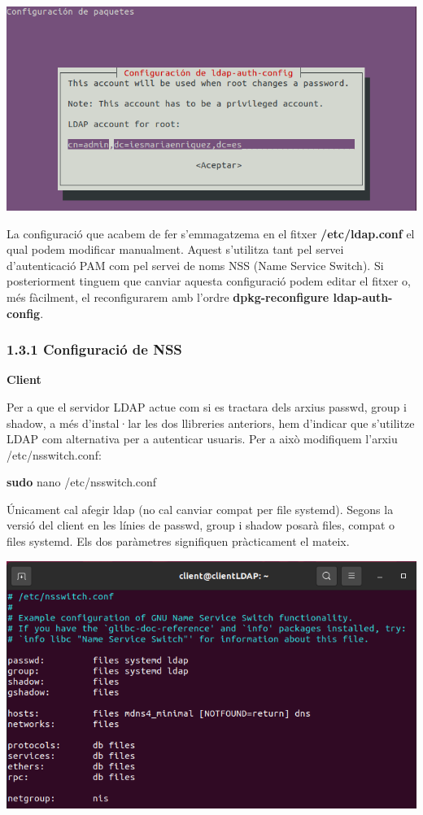 \documentclass[
  12 pt,
  a4paper,
]{article}
\newenvironment{Shaded}{\begin{snugshade}}{\end{snugshade}}
\newcommand{\FunctionTok}[1]{\textcolor[rgb]{0.13,0.29,0.53}{\textbf{#1}}}
\newcommand{\NormalTok}[1]{#1}
\begin{document}
\includegraphics{png/libpam3.png}

La configuració que acabem de fer s'emmagatzema en el fitxer
\textbf{/etc/ldap.conf} el qual podem modificar manualment. Aquest
s'utilitza tant pel servei d'autenticació PAM com pel servei de noms NSS
(Name Service Switch). Si posteriorment tinguem que canviar aquesta
configuració podem editar el fitxer o, més fàcilment, el reconfigurarem
amb l'ordre \textbf{dpkg-reconfigure ldap-auth-config}.

\subsubsection{1.3.1 Configuració de NSS}\label{configuraciuxf3-de-nss}

\textbf{Client}

Per a que el servidor LDAP actue com si es tractara dels arxius passwd,
group i shadow, a més d'instal·lar les dos llibreries anteriors, hem
d'indicar que s'utilitze LDAP com alternativa per a autenticar usuaris.
Per a això modifiquem l'arxiu /etc/nsswitch.conf:

\begin{Shaded}
\begin{Highlighting}[]
\FunctionTok{sudo}\NormalTok{ nano /etc/nsswitch.conf}
\end{Highlighting}
\end{Shaded}

Únicament cal afegir ldap (no cal canviar compat per file systemd).
Segons la versió del client en les línies de passwd, group i shadow
posarà files, compat o files systemd. Els dos paràmetres signifiquen
pràcticament el mateix.

\includegraphics{png/libpam4.png}
\end{document}
